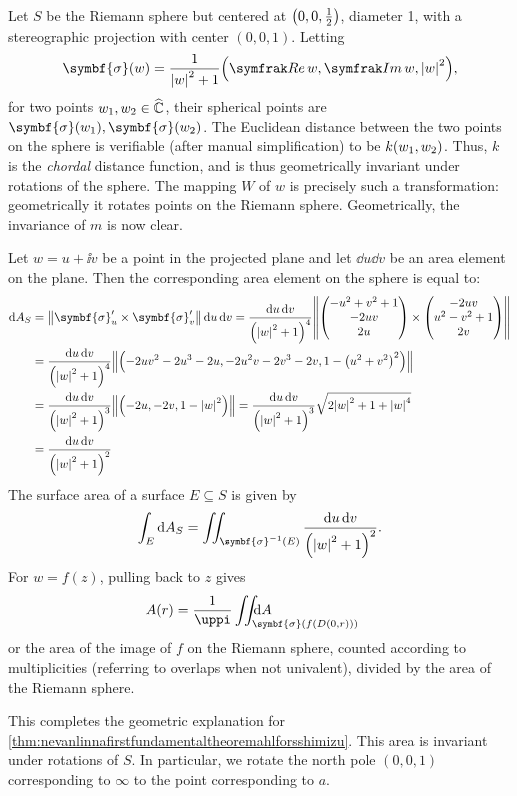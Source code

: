 Let \(S\) be the Riemann sphere but centered at \(\qty(0,0,\tfrac12)\), diameter 1, with a stereographic projection with center \((0,0,1)\). Letting \[\symbf{\sigma}\qty(w)=\frac1{\abs{w}^2+1}\qty(\Re{w},\Im{w},\abs{w}^2),\]
for two points \(w_1,w_2\in\widehat{\mathbb{C}}\), their spherical points are \(\symbf{\sigma}\qty(w_1),\symbf{\sigma}\qty(w_2)\). The Euclidean distance between the two points on the sphere is verifiable (after manual simplification) to be \(k\qty(w_1,w_2)\). Thus, \(k\) is the \textit{chordal} distance function, and is thus geometrically invariant under rotations of the sphere. The mapping \(W\) of \(w\) is precisely such a transformation: geometrically it rotates points on the Riemann sphere. Geometrically, the invariance of \(m\) is now clear.

Let \(w=u+\ii v\) be a point in the projected plane and let \(\dd{u}\dd{v}\) be an area element on the plane. Then the corresponding area element on the sphere is equal to:
\begin{align*}
    \dd{A}_S&=\norm{\symbf{\sigma}'_u\times\symbf{\sigma}'_v}\dd{u}\dd{v}=\frac{\dd{u}\dd{v}}{\qty(\abs{w}^2+1)^4}\norm{\mqty(-u^2+v^2+1\\-2uv\\2u)\times\mqty(-2uv\\u^2-v^2+1\\2v)}\\
    &=\frac{\dd{u}\dd{v}}{\qty(\abs{w}^2+1)^4}\norm{\qty(-2uv^2-2u^3-2u,-2u^2v-2v^3-2v,1-\qty(u^2+v^2)^2)}\\
    &=\frac{\dd{u}\dd{v}}{\qty(\abs{w}^2+1)^3}\norm{\qty(-2u,-2v,1-\abs{w}^2)}=\frac{\dd{u}\dd{v}}{\qty(\abs{w}^2+1)^3}\sqrt{2\abs{w}^2+1+\abs{w}^4}\\
    &=\frac{\dd{u}\dd{v}}{\qty(\abs{w}^2+1)^2}
\end{align*}
The surface area of a surface \(E\subseteq S\) is given by \[\int_E\dd{A}_S=\iint_{\symbf{\sigma}^{-1}(E)}\frac{\dd{u}\dd{v}}{\qty(\abs{w}^2+1)^2}.\]
For \(w=f(z)\), pulling back to \(z\) gives \[A(r)=\frac1{\uppi}\mathop{\mathmakebox[\widthof{\(\iint\)}][l]{\iint_{\symbf{\sigma}(f\qty(D(0,r)))}}}{\mathmakebox[\widthof{\(\iint_{\symbf{\sigma}(f\qty(D(0,r)))}\)}][l]{\dd{A}}}\] or the area of the image of \(f\) on the Riemann sphere, counted according to multiplicities (referring to overlaps when not univalent), divided by the area of the Riemann sphere.

This completes the geometric explanation for \cref{thm:nevanlinnafirstfundamentaltheoremahlforsshimizu}. This area is invariant under rotations of \(S\). In particular, we rotate the north pole \((0,0,1)\) corresponding to \(\infty\) to the point corresponding to \(a\).
